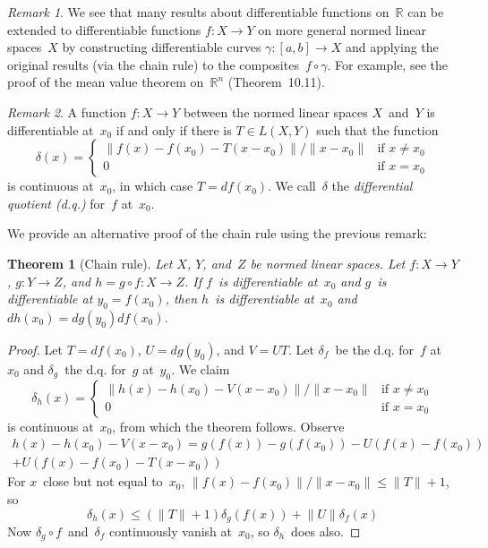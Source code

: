 \documentclass[letterpaper,12pt]{article}
\newcommand{\R}{\mathbb{R}}
\newcommand{\after}{\circ}
\newcommand{\df}{d\!f}
\newcommand{\dg}{dg}
\renewcommand{\dh}{d\!h}
\newcommand{\norm}[1]{\lVert{#1}\rVert}
\theoremstyle{plain}
\newtheorem*{thm}{Theorem}
\theoremstyle{definition}
\theoremstyle{remark}
\newtheorem*{rmk}{Remark}
\begin{document}
\begin{rmk}
We see that many results about differentiable functions on~\(\R\) can be extended to differentiable functions \(f:X\to Y\) on more general normed linear spaces~\(X\) by constructing differentiable curves \(\gamma:[a,b]\to X\) and applying the original results (via the chain rule) to the composites~\(f\after\gamma\). For example, see the proof of the mean value theorem on~\(\R^n\) (Theorem~10.11).
\end{rmk}

\begin{rmk}
A function \(f:X\to Y\) between the normed linear spaces \(X\)~and~\(Y\) is differentiable at~\(x_0\) if and only if there is \(T\in L(X,Y)\) such that the function
\[\delta(x)=\begin{cases}
\norm{f(x)-f(x_0)-T(x-x_0)}/\norm{x-x_0}&\text{if }x\ne x_0\\
0&\text{if }x=x_0
\end{cases}\]
is continuous at~\(x_0\), in which case \(T=\df(x_0)\). We call~\(\delta\) the \emph{differential quotient (d.q.)} for~\(f\) at~\(x_0\).
\end{rmk}

\noindent We provide an alternative proof of the chain rule using the previous remark:
\begin{thm}[Chain rule]
Let \(X\), \(Y\), and~\(Z\) be normed linear spaces. Let \(f:X\to Y\), \(g:Y\to Z\), and \(h=g\after f:X\to Z\). If \(f\)~is differentiable at~\(x_0\) and \(g\)~is differentiable at \(y_0=f(x_0)\), then \(h\)~is differentiable at~\(x_0\) and \(\dh(x_0)=\dg(y_0)\df(x_0)\).
\end{thm}
\begin{proof}
Let \(T=\df(x_0)\), \(U=\dg(y_0)\), and \(V=UT\). Let \(\delta_f\)~be the d.q. for~\(f\) at~\(x_0\) and \(\delta_g\)~the d.q. for~\(g\) at~\(y_0\). We claim
\[\delta_h(x)=\begin{cases}
\norm{h(x)-h(x_0)-V(x-x_0)}/\norm{x-x_0}&\text{if }x\ne x_0\\
0&\text{if }x=x_0
\end{cases}\]
is continuous at~\(x_0\), from which the theorem follows. Observe
\begin{multline*}
h(x)-h(x_0)-V(x-x_0)=g(f(x))-g(f(x_0))-U(f(x)-f(x_0))\\
	+U(f(x)-f(x_0)-T(x-x_0))
\end{multline*}
For \(x\)~close but not equal to~\(x_0\), \(\norm{f(x)-f(x_0)}/\norm{x-x_0}\le\norm{T}+1\), so
\[\delta_h(x)\le(\norm{T}+1)\delta_g(f(x))+\norm{U}\delta_f(x)\]
Now \(\delta_g\after f\)~and~\(\delta_f\) continuously vanish at~\(x_0\), so \(\delta_h\)~does also.
\end{proof}
\end{document}
